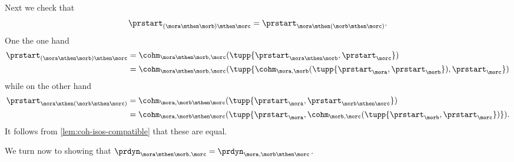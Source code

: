 Next we check that
\begin{equation}
\prstart_{(\mora \mthen \morb)\mthen \morc}  =\prstart_{\mora \mthen (\morb \mthen \morc)}.
\end{equation}
One the one hand
\begin{align*}
\prstart_{(\mora \mthen \morb)\mthen \morc} &= \cohm_{\mora \mthen \morb, \morc}( \tupp{\prstart_{\mora \mthen \morb}, \prstart_{\morc}}) \\
& = \cohm_{\mora \mthen \morb, \morc}( \tupp{ \cohm_{\mora, \morb}( \tupp{\prstart_{\mora}, \prstart_{\morb}}), \prstart_{\morc}})
\end{align*}
while on the other hand
\begin{align*}
\prstart_{\mora \mthen (\morb \mthen \morc)} &= \cohm_{\mora,\morb \mthen \morc}( \tupp{\prstart_{\mora}, \prstart_{\morb \mthen \morc}}) \\
& = \cohm_{\mora,\morb \mthen \morc}( \tupp{\prstart_{\mora}, \cohm_{\morb, \morc}( \tupp{\prstart_{\morb}, \prstart_{\morc}})}).
\end{align*}
It follows from \cref{lem:coh-isos-compatible} that these are equal.


We turn now to showing that $\prdyn_{\mora \mthen \morb, \morc} = \prdyn_{\mora, \morb \mthen \morc}$.

